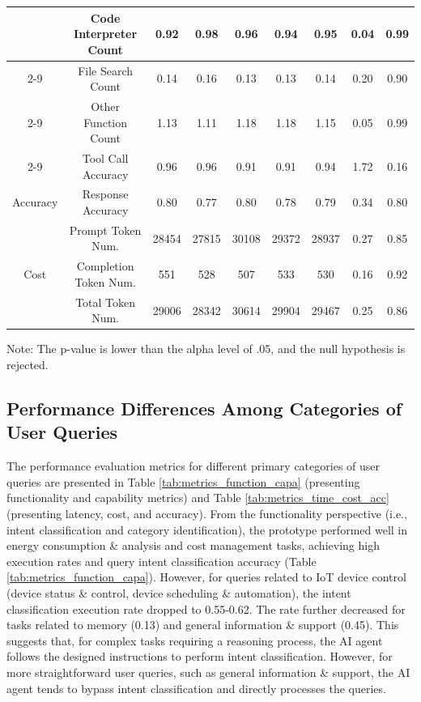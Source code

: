 \documentclass[final,3p,times]{elsarticle}
\begin{document}
\begin{table}[ht]
{\begin{tabular}{ccccccccc}
 & Code Interpreter Count & 0.92 & 0.98 & 0.96 & 0.94 & 0.95 & 0.04 & 0.99 \\ \cline{2-9} 
 & File Search Count & 0.14 & 0.16 & 0.13 & 0.13 & 0.14 & 0.20 & 0.90 \\ \cline{2-9} 
 & Other Function Count & 1.13 & 1.11 & 1.18 & 1.18 & 1.15 & 0.05 & 0.99 \\ \cline{2-9} 
 & Tool Call Accuracy & 0.96 & 0.96 & 0.91 & 0.91 & 0.94 & 1.72 & 0.16 \\ \hline
Accuracy & Response Accuracy & 0.80 & 0.77 & 0.80 & 0.78 & 0.79 & 0.34 & 0.80 \\ \hline
\multirow{3}{*}{Cost} & Prompt Token Num. & 28454 & 27815 & 30108 & 29372 & 28937 & 0.27 & 0.85 \\ \cline{2-9} 
 & Completion Token Num. & 551 & 528 & 507 & 533 & 530 & 0.16 & 0.92 \\ \cline{2-9} 
 & Total Token Num. & 29006 & 28342 & 30614 & 29904 & 29467 & 0.25 & 0.86 \\ \hline
\end{tabular}%
}
\vspace{2mm} %
\parbox{\linewidth}{\small *Note: The p-value is lower than the alpha level of .05, and the null hypothesis is rejected.}
\end{table}

\subsection{Performance Differences Among Categories of User Queries}

The performance evaluation metrics for different primary categories of user queries are presented in Table \ref{tab:metrics_function_capa} (presenting functionality and capability metrics) and Table \ref{tab:metrics_time_cost_acc} (presenting latency, cost, and accuracy). From the functionality perspective (i.e., intent classification and category identification), the prototype performed well in energy consumption \& analysis and cost management tasks, achieving high execution rates and query intent classification accuracy (Table \ref{tab:metrics_function_capa}). However, for queries related to IoT device control (device status \& control, device scheduling \& automation), the intent classification execution rate dropped to 0.55-0.62. The rate further decreased for tasks related to memory (0.13) and general information \& support (0.45). This suggests that, for complex tasks requiring a reasoning process, the AI agent follows the designed instructions to perform intent classification. However, for more straightforward user queries, such as general information \& support, the AI agent tends to bypass intent classification and directly processes the queries.
\end{document}
